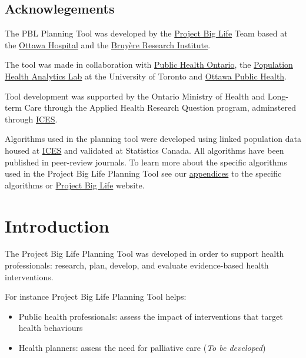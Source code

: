 \documentclass[]{book}
\providecommand{\tightlist}{%
  \setlength{\itemsep}{0pt}\setlength{\parskip}{0pt}}
\begin{document}
\hypertarget{acknowlegements}{%
\section{Acknowlegements}\label{acknowlegements}}

The PBL Planning Tool was developed by the \href{https://www.projectbiglife.ca}{Project Big Life} Team based at the \href{http://www.ohri.ca/home.asp}{Ottawa Hospital} and the \href{https://www.bruyere.org/en/bruyere-research-institute}{Bruyère Research Institute}.

The tool was made in collaboration with \href{https://www.publichealthontario.ca/}{Public Health Ontario}, the \href{https://pophealthanalytics.com/}{Population Health Analytics Lab} at the University of Toronto and \href{http://www.ottawapublichealth.ca/en/index.aspx}{Ottawa Public Health}.

Tool development was supported by the Ontario Ministry of Health and Long-term Care through the Applied Health Research Question program, adminstered through \href{https://www.ICES.on.ca}{ICES}.

Algorithms used in the planning tool were developed using linked population data housed at \href{https://www.ices.on.ca/}{ICES} and validated at Statistics Canada. All algorithms have been published in peer-review journals. To learn more about the specific algorithms used in the Project Big Life Planning Tool see our \protect\hyperlink{mport}{appendices} to the specific algorithms or \href{https://www.projectbiglife.ca/science}{Project Big Life} website.

\hypertarget{introduction}{%
\chapter{Introduction}\label{introduction}}

The Project Big Life Planning Tool was developed in order to support health professionals: research, plan, develop, and evaluate evidence-based health interventions.

For instance Project Big Life Planning Tool helps:

\begin{itemize}
\tightlist
\item
  Public health professionals: assess the impact of interventions that target health behaviours
\item
  Health planners: assess the need for palliative care (\emph{To be developed})
\end{itemize}
\end{document}
